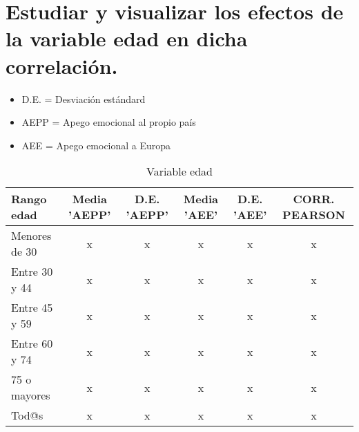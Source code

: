 \documentclass{article}
\begin{document}
\section{Estudiar y visualizar los efectos de la variable edad en dicha correlación.}
 \begin{itemize}
 \item D.E. = Desviación estándard
 \item AEPP = Apego emocional al propio país
 \item AEE = Apego emocional a Europa
 \end{itemize}
 \begin{table}[h!]
 \caption{Variable edad}
 \begin{tabular}{l | c c c c c}
 \hline
 \bf{Rango edad} & \bf{Media 'AEPP'} & \bf{D.E. 'AEPP'} & \bf{Media 'AEE'} & \bf{D.E. 'AEE'} & \bf{CORR. PEARSON} \\
 \hline
 Menores de 30 & x & x & x & x & x \\
 Entre 30 y 44 & x & x & x & x & x \\
 Entre 45 y 59 & x & x & x & x & x \\
 Entre 60 y 74 & x & x & x & x & x \\
 75 o mayores & x & x & x & x & x \\
 Tod@s & x & x & x & x & x \\
 \hline
 \end{tabular}
 \end{table}
\end{document}
